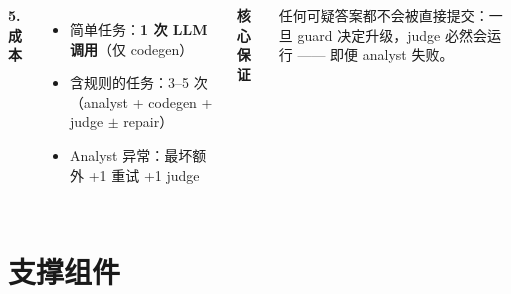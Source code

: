 \documentclass[11pt, aspectratio=169]{beamer}
\begin{document}
\begin{frame}[t]
\begin{columns}[T,onlytextwidth]
\vspace{0.3em}

\textbf{5. 成本}

\vspace{0.05em}
\begin{itemize}
    \setlength\itemsep{0.05em}
    \item 简单任务：\textbf{1 次 LLM 调用}（仅 codegen）
    \item 含规则的任务：3--5 次（analyst + codegen + judge $\pm$ repair）
    \item Analyst 异常：最坏额外 +1 重试 +1 judge
\end{itemize}
\vspace{0.1em}
\alert{\textbf{核心保证}}

\scriptsize
任何可疑答案都不会被直接提交：一旦 guard 决定升级，judge 必然会运行 —— 即便 analyst 失败。

\end{columns}
\end{frame}


\section{支撑组件}
\end{document}
